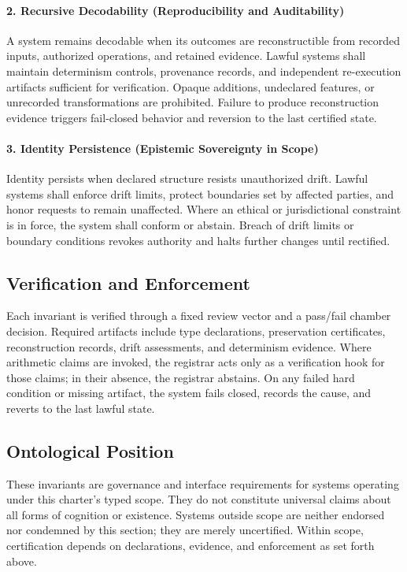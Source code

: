 \documentclass[12pt]{amsart}
\theoremstyle{plain}
\begin{document}
\paragraph{2. Recursive Decodability (Reproducibility and Auditability)}
A system remains decodable when its outcomes are reconstructible from recorded inputs, authorized operations, and retained evidence. Lawful systems shall maintain determinism controls, provenance records, and independent re-execution artifacts sufficient for verification. Opaque additions, undeclared features, or unrecorded transformations are prohibited. Failure to produce reconstruction evidence triggers fail-closed behavior and reversion to the last certified state.
\\
\paragraph{3. Identity Persistence (Epistemic Sovereignty in Scope)}
Identity persists when declared structure resists unauthorized drift. Lawful systems shall enforce drift limits, protect boundaries set by affected parties, and honor requests to remain unaffected. Where an ethical or jurisdictional constraint is in force, the system shall conform or abstain. Breach of drift limits or boundary conditions revokes authority and halts further changes until rectified.

\subsection*{Verification and Enforcement}

Each invariant is verified through a fixed review vector and a pass/fail chamber decision. Required artifacts include type declarations, preservation certificates, reconstruction records, drift assessments, and determinism evidence. Where arithmetic claims are invoked, the registrar acts only as a verification hook for those claims; in their absence, the registrar abstains. On any failed hard condition or missing artifact, the system fails closed, records the cause, and reverts to the last lawful state.

\subsection*{Ontological Position}

These invariants are governance and interface requirements for systems operating under this charter’s typed scope. They do not constitute universal claims about all forms of cognition or existence. Systems outside scope are neither endorsed nor condemned by this section; they are merely uncertified. Within scope, certification depends on declarations, evidence, and enforcement as set forth above.
\end{document}
